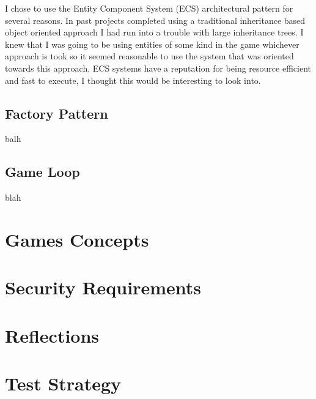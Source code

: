 \documentclass{article}
\begin{document}
I chose to use the Entity Component System (ECS) architectural pattern for several reasons.
In past projects completed using a traditional inheritance based object oriented approach I had run into a trouble with large inheritance trees. 
I knew that I was going to be using entities of some kind in the game whichever approach is took so it seemed reasonable to use the system that was oriented towards this approach.
ECS systems have a reputation for being resource efficient and fast to execute, I thought this would be interesting to look into.

\subsection{Factory Pattern}

balh

\subsection{Game Loop}

blah

\section{Games Concepts}
\section{Security Requirements}
\section{Reflections}
\section{Test Strategy}
\end{document}
